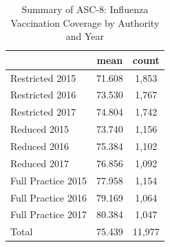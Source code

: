 \begin{table}[htbp]\centering
\def\sym#1{\ifmmode^{#1}\else\(^{#1}\)\fi}
\caption{Summary of ASC-8: Influenza Vaccination Coverage by Authority and Year}
\begin{tabular}{l*{1}{cc}}
\toprule
                    &        mean&       count\\
\midrule
Restricted 2015     &      71.608&       1,853\\
Restricted 2016     &      73.530&       1,767\\
Restricted 2017     &      74.804&       1,742\\
Reduced 2015        &      73.740&       1,156\\
Reduced 2016        &      75.384&       1,102\\
Reduced 2017        &      76.856&       1,092\\
Full Practice 2015  &      77.958&       1,154\\
Full Practice 2016  &      79.169&       1,064\\
Full Practice 2017  &      80.384&       1,047\\
Total               &      75.439&      11,977\\
\bottomrule
\end{tabular}
\end{table}
